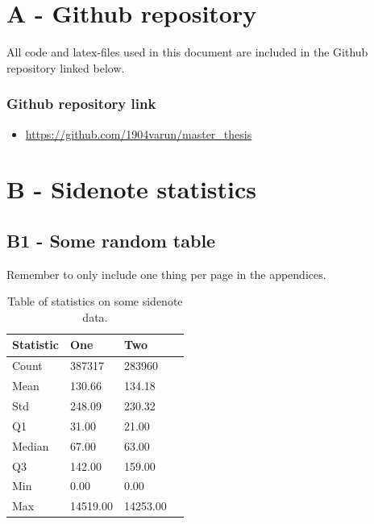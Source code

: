 

\chapter*{A - Github repository}

All code and latex-files used in this document are included in the Github repository linked below. 


\subsection*{Github repository link}
\begin{itemize}
    \item \url{https://github.com/1904varun/master_thesis}
\end{itemize}




\chapter*{B - Sidenote statistics}

\renewcommand{\thefigure}{B.\arabic{figure}}
\setcounter{figure}{0}
\renewcommand{\thetable}{B.\arabic{table}}
\setcounter{table}{0}


\section*{\large{B1 - Some random table}}
\vspace*{1cm}

Remember to only include one thing per page in the appendices.

\begin{table}[ht!]
\centering
    \begin{tabular}{ m{4cm} m{2.5cm} m{2.5cm} m{2.5cm} } 
    \toprule
    \toprule
    \textbf{Statistic} & \textbf{One} & \textbf{Two}  \\
    \midrule
    Count   & 387317    & 283960    \\[1.3ex]
    Mean    & 130.66    & 134.18    \\[1.3ex]
    Std     & 248.09    & 230.32    \\[1.3ex]
    Q1      & 31.00     & 21.00     \\[1.3ex]
    Median  & 67.00     & 63.00     \\[1.3ex]
    Q3      & 142.00    & 159.00    \\[1.3ex]
    Min     & 0.00      & 0.00      \\[1.3ex]
    Max     & 14519.00  & 14253.00  \\[1.3ex]
    \bottomrule
    \bottomrule
    \end{tabular}
\caption[Statistics on something]{Table of statistics on some sidenote data.}
\end{table}


